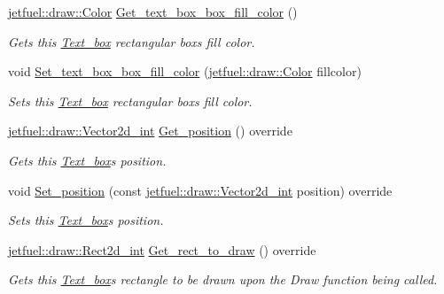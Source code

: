 \begin{DoxyCompactItemize}
\hyperlink{classjetfuel_1_1draw_1_1Color}{jetfuel\+::draw\+::\+Color} \hyperlink{classjetfuel_1_1gui_1_1Text__box_aca83661e45b31506a7cfe5ce686cacbd}{Get\+\_\+text\+\_\+box\+\_\+box\+\_\+fill\+\_\+color} ()
\begin{DoxyCompactList}\small\item\em Gets this \hyperlink{classjetfuel_1_1gui_1_1Text__box}{Text\+\_\+box} rectangular box\textquotesingle{}s fill color. \end{DoxyCompactList}\item 
void \hyperlink{classjetfuel_1_1gui_1_1Text__box_aca9d68ecbd6dc071c17eaa98d844ffc2}{Set\+\_\+text\+\_\+box\+\_\+box\+\_\+fill\+\_\+color} (\hyperlink{classjetfuel_1_1draw_1_1Color}{jetfuel\+::draw\+::\+Color} fillcolor)
\begin{DoxyCompactList}\small\item\em Sets this \hyperlink{classjetfuel_1_1gui_1_1Text__box}{Text\+\_\+box} rectangular box\textquotesingle{}s fill color. \end{DoxyCompactList}\item 
\hyperlink{classjetfuel_1_1draw_1_1Vector2d}{jetfuel\+::draw\+::\+Vector2d\+\_\+int} \hyperlink{classjetfuel_1_1gui_1_1Text__box_ae59b52ecc11c9664307013e376f2cb29}{Get\+\_\+position} () override
\begin{DoxyCompactList}\small\item\em Gets this \hyperlink{classjetfuel_1_1gui_1_1Text__box}{Text\+\_\+box}\textquotesingle{}s position. \end{DoxyCompactList}\item 
void \hyperlink{classjetfuel_1_1gui_1_1Text__box_a86476b518f2aa3ea4d00ac67f2b03703}{Set\+\_\+position} (const \hyperlink{classjetfuel_1_1draw_1_1Vector2d}{jetfuel\+::draw\+::\+Vector2d\+\_\+int} position) override
\begin{DoxyCompactList}\small\item\em Sets this \hyperlink{classjetfuel_1_1gui_1_1Text__box}{Text\+\_\+box}\textquotesingle{}s position. \end{DoxyCompactList}\item 
\hyperlink{classjetfuel_1_1draw_1_1Rect2d}{jetfuel\+::draw\+::\+Rect2d\+\_\+int} \hyperlink{classjetfuel_1_1gui_1_1Text__box_ae4cec83c8751ad592f1005e7c7c6441b}{Get\+\_\+rect\+\_\+to\+\_\+draw} () override
\begin{DoxyCompactList}\small\item\em Gets this \hyperlink{classjetfuel_1_1gui_1_1Text__box}{Text\+\_\+box}\textquotesingle{}s rectangle to be drawn upon the Draw function being called. \end{DoxyCompactList}\item 

\end{DoxyCompactItemize}
